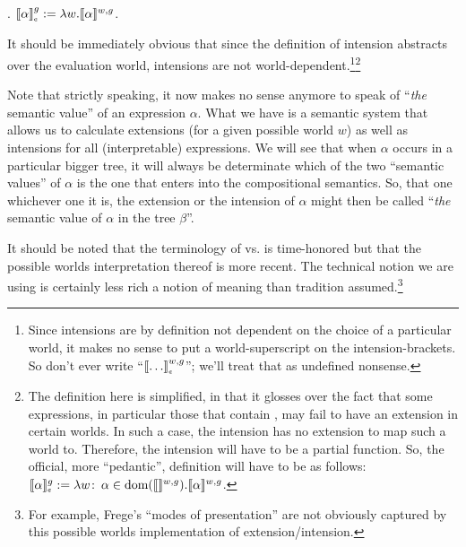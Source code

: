 \ex. $\svcent{\alpha}^g := \lambda w. \sv{\alpha}^{w,g}$.

It should be immediately obvious that since the definition of intension abstracts over the evaluation world, intensions are not world-dependent.\footnote{Since intensions are by definition not dependent on the choice of a particular world, it makes no sense to put a world-superscript on the intension-brackets. So don't ever write ``$\svcent{\dots}^{w,g}$''; we'll treat that as undefined nonsense.}\footnote{The definition here is simplified, in that it glosses over the fact that some expressions, in particular those that contain , may fail to have an extension in certain worlds. In such a case, the intension has no extension to map such a world to. Therefore, the intension will have to be a partial function. So, the official, more ``pedantic'', definition will have to be as follows: $\sv{\alpha}_{\tiny \mbox{\textcent}}^g := \lambda w\co \alpha \in \mbox{dom}(\sv{\null}^{w,g}). \sv{\alpha}^{w,g}$.}

Note that strictly speaking, it now makes no sense anymore to speak of ``\emph{the} semantic value'' of an expression $\alpha$. What we have is a semantic system that allows us to calculate extensions (for a given possible world $w$) as well as intensions for all (interpretable) expressions. We will see that when $\alpha$ occurs in a particular bigger tree, it will always be determinate which of the two ``semantic values'' of $\alpha$ is the one that enters into the compositional semantics. So, that one \dash whichever one it is, the extension or the intension of $\alpha$ \dash might then be called ``\emph{the} semantic value of $\alpha$ in the tree $\beta$''.

It should be noted that the terminology of  vs.  is time-honored but that the possible worlds interpretation thereof is more recent. The technical notion we are using is certainly less rich a notion of meaning than tradition assumed.\footnote{For example, Frege's ``modes of presentation'' are not obviously captured by this possible worlds implementation of extension/intension.} 

